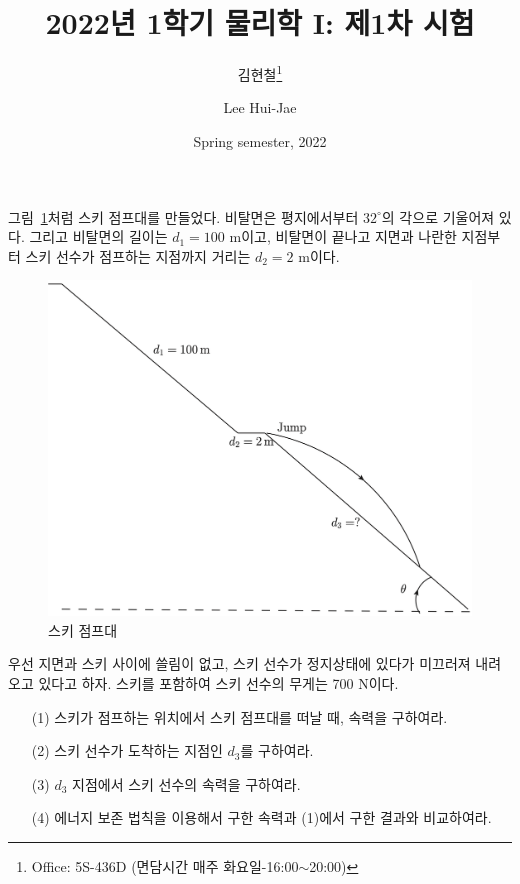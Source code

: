 \documentclass[floatfix,nofootinbib,superscriptaddress,fleqn]{revtex4-2}
\begin{document}
\title{\Large 2022년 1학기 물리학 I: 제1차 시험}
\author{김현철\footnote{Office: 5S-436D (면담시간 매주
    화요일-16:00$\sim$20:00)}} 
\author{Lee Hui-Jae} 
\date{Spring semester, 2022}


\maketitle

그림~\ref{fig:1}처럼 스키 점프대를 만들었다. 비탈면은 평지에서부터
$32^\circ$의 각으로 기울어져 있다. 그리고 비탈면의 길이는 $d_1=100$
m이고, 비탈면이 끝나고 지면과 나란한 지점부터 스키 선수가 점프하는
지점까지 거리는 $d_2=2$ m이다. 
\begin{figure}[ht]
  \centering
\includegraphics[scale=0.5]{Qfig9-20220330.png}  
  \caption{스키 점프대}
  \label{fig:1}
\end{figure}
우선 지면과 스키 사이에 쓸림이 없고, 스키 선수가 정지상태에 있다가 미끄러져
내려오고 있다고 하자. 스키를 포함하여 스키 선수의 무게는 700 N이다. 
\begin{itemize}
\item[(1)] 스키가 점프하는 위치에서 스키 점프대를 떠날 때, 속력을
  구하여라.
\item[(2)] 스키 선수가 도착하는 지점인 $d_3$를 구하여라.
\item[(3)] $d_3$ 지점에서 스키 선수의 속력을 구하여라.   
\item[(4)] 에너지 보존 법칙을 이용해서 구한 속력과 (1)에서 구한 결과와
  비교하여라. 
\end{itemize}
\end{document}
